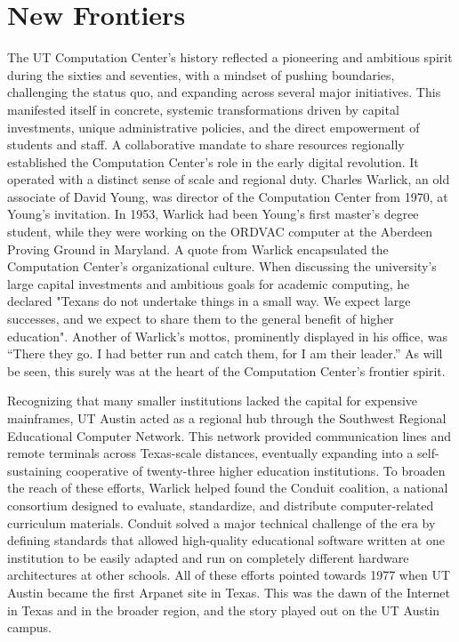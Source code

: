 \chapter{New Frontiers}

The UT Computation Center’s history reflected a pioneering and ambitious spirit during the sixties and seventies, with a mindset of pushing boundaries, challenging the status quo, and expanding across several major initiatives. This manifested itself in concrete, systemic transformations driven by capital investments, unique administrative policies, and the direct empowerment of students and staff. A collaborative mandate to share resources regionally established the Computation Center’s role in the early digital revolution. It operated with a distinct sense of scale and regional duty. Charles Warlick, an old associate of David Young, was director of the Computation Center from 1970, at Young's invitation. In 1953, Warlick had been Young's first master's degree student, while they were working on the ORDVAC computer at the Aberdeen Proving Ground in Maryland. A quote from Warlick encapsulated the Computation Center's organizational culture. When discussing the university's large capital investments and ambitious goals for academic computing, he declared "Texans do not undertake things in a small way. We expect large successes, and we expect to share them to the general benefit of higher education". Another of Warlick’s mottos, prominently displayed in his office, was “There they go. I had better run and catch them, for I am their leader.” As will be seen, this surely was at the heart of the Computation Center’s frontier spirit. \cite{youngUseRichardsonsMethod1953}

Recognizing that many smaller institutions lacked the capital for expensive mainframes, UT Austin acted as a regional hub through the Southwest Regional Educational Computer Network. This network provided communication lines and remote terminals across Texas-scale distances, eventually expanding into a self-sustaining cooperative of twenty-three higher education institutions. To broaden the reach of these efforts, Warlick helped found the Conduit coalition, a national consortium designed to evaluate, standardize, and distribute computer-related curriculum materials. Conduit solved a major technical challenge of the era by defining standards that allowed high-quality educational software written at one institution to be easily adapted and run on completely different hardware architectures at other schools. All of these efforts pointed towards 1977 when UT Austin became the first Arpanet site in Texas. This was the dawn of the Internet in Texas and in the broader region, and the story played out on the UT Austin campus. \cite{warlickSouthwestRegionalEducational1974}

